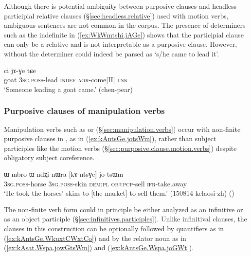 Although there is potential ambiguity between purposive clauses and headless participial relative clauses (§\ref{sec:headless.relative}) used with motion verbs, ambiguous sentences are not common in the corpus. The presence of determiners such as the indefinite  in (\ref{ex:WkWmtshi.jAGe}) shows that the participial clause can only be a relative and is not interpretable as a purposive clause. However,  without the determiner could indeed be parsed as `s/he came to lead it'.

\begin{exe}
	\ex \label{ex:WkWmtshi.jAGe}
	 ci jɤ-ɣe tɕe \\
	goat \textsc{3sg}.\textsc{poss}-lead \textsc{indef} \textsc{aor}-come[II] \textsc{lnk} \\
	\glt `Someone leading a goat came.' (chen-pear)
\end{exe}

\subsubsection{Purposive clauses of manipulation verbs} \label{sec:participial.clause.essive}
Manipulation verbs such as  or  (§\ref{sec:manipulation.verbs}) occur with non-finite purposive clauses in , as in (\ref{ex:kAntsGe.jotsWm}), rather than subject participles like the motion verbs (§\ref{sec:purposive.clause.motion.verbs}) despite obligatory subject coreference.

\begin{exe}
	\ex \label{ex:kAntsGe.jotsWm}
	\gll ɯ-mbro ɯ-ndʐi nɯra [kɤ-ntsɣe] jo-tsɯm \\
	\textsc{3sg}.\textsc{poss}-horse \textsc{3sg}.\textsc{poss}-skin \textsc{dem}:\textsc{pl} \textsc{obj}:\textsc{pcp}-sell \textsc{ifr}-take.away \\
	\glt `He took the horses' skins to [the market] to sell them.' (150814 kelaosi-zh)
()
\end{exe}

The non-finite verb form  could in principle be either analyzed as an infinitive or as an object participle (§\ref{sec:infinitives.participles}). Unlike infinitival clauses, the  clauses in this construction can be optionally followed by quantifiers as in (\ref{ex:kAntsGe.WkuxtCWxtCo}) and by the relator noun  as in (\ref{ex:kAsat.Wspa.jowGtsWm}) and (\ref{ex:kAntsGe.Wspa.joGWt}). 

